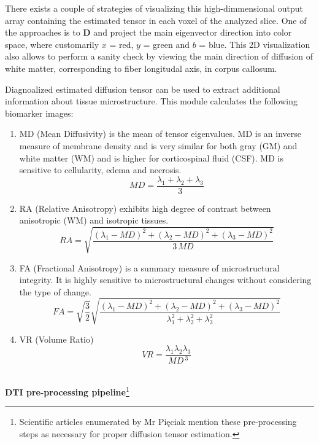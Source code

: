 There exists a couple of strategies of visualizing this high-dimmensional
output array containing the estimated tensor in each voxel of the
analyzed slice. One of the approaches is to $\boldsymbol{D}$ and
project the main eigenvector direction into color space, where customarily
$x$ = red, $y$ = green and $b$ = blue. This 2D visualization also
allows to perform a sanity check by viewing the main direction of
diffusion of white matter, corresponding to fiber longitudal axis,
in corpus callosum.

Diagnoalized estimated diffusion tensor can be used to extract additional
information about tissue microstructure. This module calculates the
following biomarker images: 
\begin{enumerate}
\item MD (Mean Diffusivity) is the mean of tensor eigenvalues. MD is an
inverse measure of membrane density and is very similar for both gray
(GM) and white matter (WM) and is higher for corticospinal fluid (CSF).
MD is sensitive to cellularity, edema and necrosis. 
\begin{equation}
MD=\dfrac{\lambda_{1}+\lambda_{2}+\lambda_{3}}{3}\label{Eq:dti_eq_4}
\end{equation}
\item RA (Relative Anisotropy) exhibits high degree of contrast between
anisotropic (WM) and isotropic tissues. 
\begin{equation}
RA=\sqrt{\dfrac{\left(\lambda_{1}-MD\right)^{2}+\left(\lambda_{2}-MD\right)^{2}+\left(\lambda_{3}-MD\right)^{2}}{3\,MD}}\label{Eq:dti_eq_5}
\end{equation}
\item FA (Fractional Anisotropy) is a summary measure of microstructural
integrity. It is highly sensitive to microstructural changes without
considering the type of change. 
\begin{equation}
FA=\sqrt{\dfrac{3}{2}}\sqrt{\dfrac{\left(\lambda_{1}-MD\right)^{2}+\left(\lambda_{2}-MD\right)^{2}+\left(\lambda_{3}-MD\right)^{2}}{\lambda_{1}^{2}+\lambda_{2}^{2}+\lambda_{3}^{2}}}\label{Eq:dti_eq_6}
\end{equation}
\item VR (Volume Ratio) 
\begin{equation}
VR=\frac{\lambda_{1}\lambda_{2}\lambda_{3}}{MD\,^{3}}\label{Eq:dti_eq_7}
\end{equation}
\end{enumerate}
\hfill{}\\
\textbf{DTI pre-processing pipeline}\footnote{Scientific articles enumerated by Mr Pięciak mention these pre-processing
steps as necessary for proper diffusion tensor estimation.}

